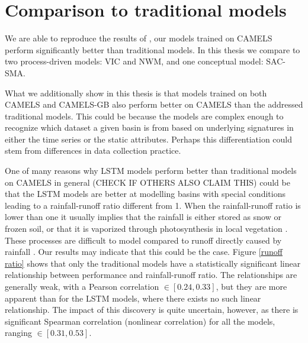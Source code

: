 \section{Comparison to traditional models}
We are able to reproduce the results of \citet{lstm_second_paper,lstm_third_paper}, our models 
trained on CAMELS perform significantly better than traditional models. In this 
thesis we compare to two process-driven models: VIC and NWM, and one conceptual 
model: SAC-SMA. 

What we additionally show in this thesis is that models trained on both CAMELS and CAMELS-GB 
also perform better on CAMELS than the addressed traditional models. This could 
be because the models are complex enough to recognize which dataset a given 
basin is from based on underlying signatures in either the time series or the 
static attributes. Perhaps this differentiation could stem from differences in 
data collection practice. 

One of many reasons why LSTM models perform better than traditional models on CAMELS in general
(CHECK IF OTHERS ALSO CLAIM THIS) \citationneeded could be that the LSTM 
models are better at modelling basins with special conditions leading to 
a rainfall-runoff ratio different from 1. When the rainfall-runoff ratio is lower 
than one it usually implies that the rainfall is either stored as snow or frozen 
soil, or that it is vaporized through photosynthesis in local vegetation \citationneeded. 
These processes are difficult to model compared to runoff directly caused by 
rainfall \citationneeded.
Our results may indicate that this could be the case.
Figure \ref{runoff ratio} shows that only the traditional models have 
a statistically significant linear relationship between performance and 
rainfall-runoff ratio. The relationships are generally weak, with a Pearson 
correlation $\in \left[ 0.24, 0.33 \right]$, but they are more apparent than 
for the LSTM models, where there exists no such linear relationship. The impact 
of this discovery is quite uncertain, however, as there is significant 
Spearman correlation (nonlinear correlation) for all the models, ranging 
$\in \left[ 0.31, 0.53 \right]$.
